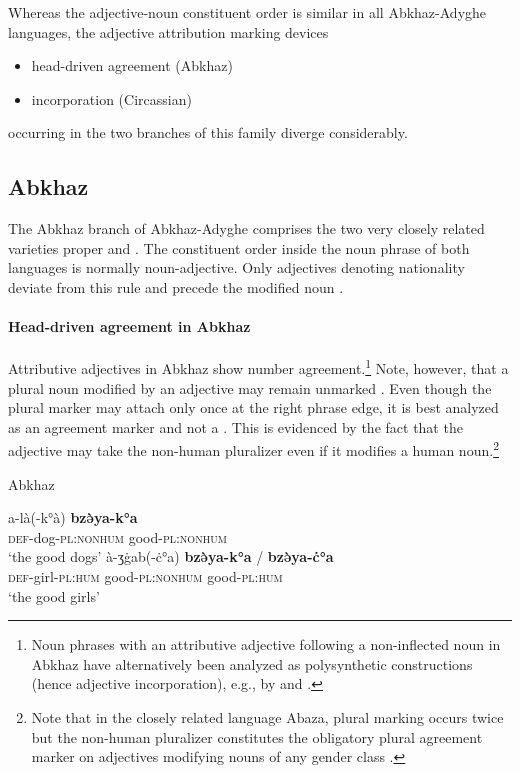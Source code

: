 Whereas the adjective-noun constituent order is similar in all Abkhaz-Adyghe languages, the adjective attribution marking devices
\begin{itemize}
\item head\hyp{}driven agreement (Abkhaz)
\item incorporation (Circassian)
\end{itemize}
occurring in the two branches of this family diverge considerably.

\subsection{Abkhaz}
The Abkhaz branch of Abkhaz-Adyghe comprises the two very closely related varieties  proper and . The constituent order inside the noun phrase of both languages is normally noun-adjective. Only adjectives denoting nationality deviate from this rule and precede the modified noun \citep[222]{comrie1981}.

\paragraph*{Head\hyp{}driven agreement in Abkhaz}
Attributive adjectives in Abkhaz show number agreement.\footnote{Noun phrases with an attributive adjective following a non-inflected noun in Abkhaz have alternatively been analyzed as polysynthetic constructions (hence adjective incorporation), e.g., by \citet[123]{rijkhoff2002} and \citet{gil2005}.} Note, however, that a plural noun modified by an adjective may remain unmarked \citep[46]{hewitt1989a}. Even though the plural marker may attach only once at the right phrase edge, it is best analyzed as an agreement marker and not a . This is evidenced by the fact that the adjective may take the non-human pluralizer even if it modifies a human noun.\footnote{Note that in the closely related language Abaza, plural marking occurs twice but the non-human pluralizer constitutes the obligatory plural agreement marker on adjectives modifying nouns of any gender class \citep[100]{lomtatidze-etal1989}.}
\begin{exe}
\ex \rm{Abkhaz \citep{hewitt1989a}}
\begin{xlist}
\ex
\gll	a-là(-k°à) \textbf{bzə̀ya-k°a}\\
	\textsc{def}-dog-\textsc{pl:nonhum} good-\textsc{pl:nonhum}\\
\glt	‘the good dogs’
\ex	
\gll	à-ʒġab(-ċ°a) \textbf{bzə̀ya-k°a} / \textbf{bzə̀ya-ċ°a}\\
	\textsc{def}-girl-\textsc{pl:hum} good-\textsc{pl:nonhum} {} good-\textsc{pl:hum}\\
\glt	‘the good girls’
\end{xlist}
\end{exe}

